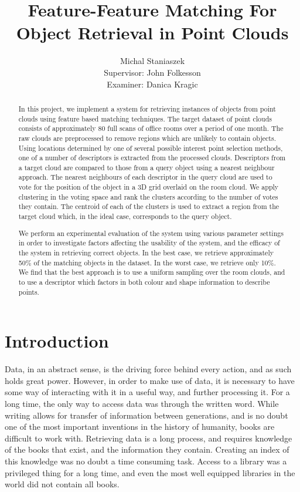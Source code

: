 \documentclass[11pt,a4paper]{kth-mag}
\author{Michal Staniaszek \\ \vskip 3cm Supervisor: John Folkesson \\ Examiner:
  Danica Kragic}
\title{Feature-Feature Matching For Object Retrieval in Point Clouds}
\begin{document}
\maketitle
\begin{abstract}
  In this project, we implement a system for retrieving instances of objects
  from point clouds using feature based matching techniques. The target dataset
  of point clouds consists of approximately 80 full scans of office rooms over a
  period of one month. The raw clouds are preprocessed to remove regions which
  are unlikely to contain objects. Using locations determined by one of several
  possible interest point selection methods, one of a number of descriptors is
  extracted from the processed clouds. Descriptors from a target cloud are
  compared to those from a query object using a nearest neighbour approach. The
  nearest neighbours of each descriptor in the query cloud are used to vote for
  the position of the object in a 3D grid overlaid on the room cloud. We apply
  clustering in the voting space and rank the clusters according to the number
  of votes they contain. The centroid of each of the clusters is used to extract
  a region from the target cloud which, in the ideal case, corresponds to the
  query object.

  We perform an experimental evaluation of the system using various parameter
  settings in order to investigate factors affecting the usability of the
  system, and the efficacy of the system in retrieving correct objects. In the
  best case, we retrieve approximately 50\% of the matching objects in the
  dataset. In the worst case, we retrieve only 10\%. We find that the best
  approach is to use a uniform sampling over the room clouds, and to use a
  descriptor which factors in both colour and shape information to describe
  points.
\end{abstract}
\newpage
\tableofcontents
\chapter{Introduction}
Data, in an abstract sense, is the driving force behind every action, and as
such holds great power. However, in order to make use of data, it is necessary
to have some way of interacting with it in a useful way, and further processing
it. For a long time, the only way to access data was through the written word.
While writing allows for transfer of information between generations, and is no
doubt one of the most important inventions in the history of humanity, books are
difficult to work with. Retrieving data is a long process, and requires
knowledge of the books that exist, and the information they contain. Creating an
index of this knowledge was no doubt a time consuming task. Access to a library
was a privileged thing for a long time, and even the most well equipped
libraries in the world did not contain all books.
\end{document}
